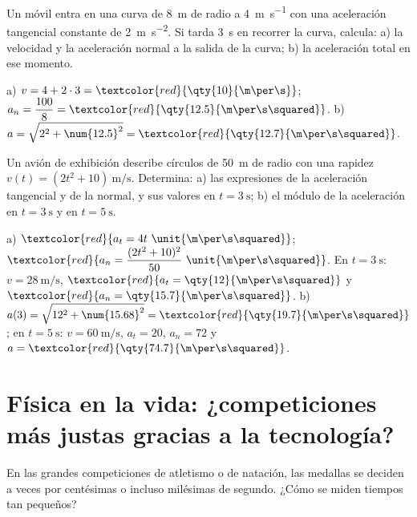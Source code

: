 \begin{exercise}
    Un móvil entra en una curva de \qty{8}{\m} de radio a \qty{4}{\m\per\s} con una aceleración tangencial constante de
    \qty{2}{\m\per\s\squared}. Si tarda \qty{3}{\s} en recorrer la curva, calcula: a) la velocidad y la aceleración normal a la
    salida de la curva; b) la aceleración total en ese momento.
    \begin{solu}
        a) \(v = 4 + 2 \cdot 3 = \textcolor{red}{\qty{10}{\m\per\s}}\); \(a_n = \dfrac{100}{8} = \textcolor{red}{\qty{12.5}{\m\per\s\squared}}\).
        b) \(a = \sqrt{2^2 + \num{12.5}^2} = \textcolor{red}{\qty{12.7}{\m\per\s\squared}}\).
    \end{solu}
\end{exercise}

\begin{exercise}
    Un avión de exhibición describe círculos de \qty{50}{\m} de radio con una rapidez \(v(t) = (2t^2 + 10)~\unit{\m\per\s}\).
    Determina: a) las expresiones de la aceleración tangencial y de la normal, y sus valores en \(t = \qty{3}{\s}\); b) el módulo de
    la aceleración en \(t = \qty{3}{\s}\) y en \(t = \qty{5}{\s}\).
    \begin{solu}
        a) \(\textcolor{red}{a_t = 4t~\unit{\m\per\s\squared}}\); \(\textcolor{red}{a_n = \dfrac{(2t^2 + 10)^2}{50}~\unit{\m\per\s\squared}}\).
        En \(t = \qty{3}{\s}\): \(v = \qty{28}{\m\per\s}\), \(\textcolor{red}{a_t = \qty{12}{\m\per\s\squared}}\) y
        \(\textcolor{red}{a_n = \qty{15.7}{\m\per\s\squared}}\). b) \(a(3) = \sqrt{12^2 + \num{15.68}^2} = \textcolor{red}{\qty{19.7}{\m\per\s\squared}}\);
        en \(t = \qty{5}{\s}\): \(v = \qty{60}{\m\per\s}\), \(a_t = 20\), \(a_n = 72\) y \(a = \textcolor{red}{\qty{74.7}{\m\per\s\squared}}\).
    \end{solu}
\end{exercise}

\section{Física en la vida: ¿competiciones más justas gracias a la tecnología?}\label{sec:ud8-cronometraje}

En las grandes competiciones de atletismo o de natación, las medallas se deciden a veces por centésimas o incluso milésimas de
segundo. ¿Cómo se miden tiempos tan pequeños?

